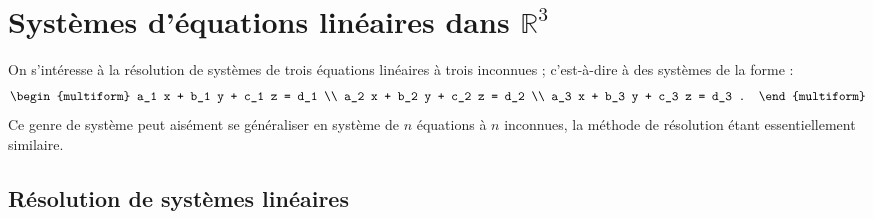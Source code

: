 
\TCDLessonStyleOn
\chapter{Syst\`emes d'\'equations lin\'eaires dans $\mathbb{R}^3$}
On s'int\'eresse \`a la r\'esolution de syst\`emes de trois \'equations lin\'eaires \`a trois inconnues ;
c'est-\`a-dire \`a des syst\`emes de la forme :
\[
	\begin{multiform}
		a_1 x + b_1 y + c_1 z = d_1	\\
		a_2 x + b_2 y + c_2 z = d_2	\\
		a_3 x + b_3 y + c_3 z = d_3	.
	\end{multiform}
\]
Ce genre de syst\`eme peut ais\'ement se g\'en\'eraliser en syst\`eme de $n$ \'equations \`a $n$ inconnues, 
la m\'ethode de r\'esolution \'etant essentiellement similaire.

                  \section{R\'esolution de syst\`emes lin\'eaires}
